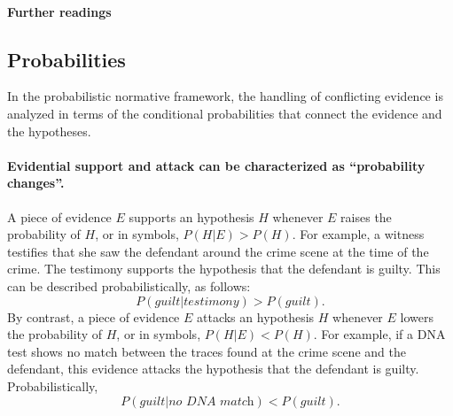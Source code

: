 \documentclass[10pt]{article}
\begin{document}


\paragraph{Further readings} 

\cite{bennettFeldman1981,penningtonHastie1993,penningtonHastie1993StoryModel,wagenaarEtal1993}

\subsection{Probabilities}

In the probabilistic normative framework, the handling of conflicting evidence is analyzed in terms of the conditional probabilities that connect the evidence and the hypotheses.

\paragraph{Evidential support and attack can be characterized as ``probability changes''.} 
A piece of evidence $E$ supports an 
hypothesis $H$ whenever $E$ raises the probability of $H$, or in symbols, 
$P(H|E) > P(H)$. 
For example, a witness 
testifies that she saw the defendant around the crime scene
 at the time of the crime. The testimony supports the hypothesis 
 that the defendant is guilty. 
This can be described probabilistically, as follows:
 \[ P(\textit{guilt}|\textit{testimony}) > P(\textit{guilt}).\] 
By contrast, a piece of evidence $E$ attacks an hypothesis $H$ whenever $E$ lowers 
the probability of $H$, or in symbols, $P(H|E) < P(H)$.
For example, if a DNA test shows no match between the traces found at the crime
 scene and the defendant, this evidence attacks the hypothesis that the defendant is guilty. 
 Probabilistically, 
%
\[ P(\textit{guilt}|\textit{no DNA match}) < P(\textit{guilt}).\]  
%
 
\end{document}
